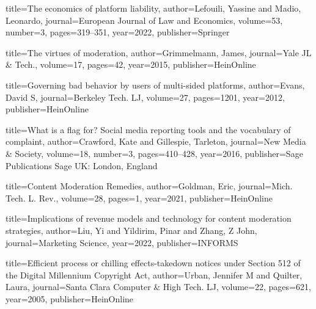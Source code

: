 {
  title={The economics of platform liability},
  author={Lefouili, Yassine and Madio, Leonardo},
  journal={European Journal of Law and Economics},
  volume={53},
  number={3},
  pages={319--351},
  year={2022},
  publisher={Springer}
}




{
  title={The virtues of moderation},
  author={Grimmelmann, James},
  journal={Yale JL \& Tech.},
  volume={17},
  pages={42},
  year={2015},
  publisher={HeinOnline}
}


{
  title={Governing bad behavior by users of multi-sided platforms},
  author={Evans, David S},
  journal={Berkeley Tech. LJ},
  volume={27},
  pages={1201},
  year={2012},
  publisher={HeinOnline}
}

{
  title={What is a flag for? Social media reporting tools and the vocabulary of complaint},
  author={Crawford, Kate and Gillespie, Tarleton},
  journal={New Media \& Society},
  volume={18},
  number={3},
  pages={410--428},
  year={2016},
  publisher={Sage Publications Sage UK: London, England}
}

{
  title={Content Moderation Remedies},
  author={Goldman, Eric},
  journal={Mich. Tech. L. Rev.},
  volume={28},
  pages={1},
  year={2021},
  publisher={HeinOnline}
}


{
  title={Implications of revenue models and technology for content moderation strategies},
  author={Liu, Yi and Yildirim, Pinar and Zhang, Z John},
  journal={Marketing Science},
  year={2022},
  publisher={INFORMS}
}


{
  title={Efficient process or chilling effects-takedown notices under Section 512 of the Digital Millennium Copyright Act},
  author={Urban, Jennifer M and Quilter, Laura},
  journal={Santa Clara Computer \& High Tech. LJ},
  volume={22},
  pages={621},
  year={2005},
  publisher={HeinOnline}
}


